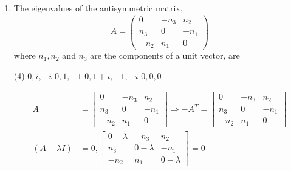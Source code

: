 \begin{enumerate}[label=\color{ocre}\textbf{\arabic*.}]
\begin{answer}
	\begin{align*}
	\intertext{The given matrix $A$ has identical rows and columns}
	\intertext{So it's eigen values are,}
	\lambda=0,0\ \text{Trace}=0,0,14
	\intertext{Another solution}
	\text{For eigenvalues }|A-\lambda I|=0 \Rightarrow\left[\begin{array}{ccc}1-\lambda & 2 & 3 \\ 2 & 4-\lambda & 6 \\ 3 & 6 & 9-\lambda\end{array}\right]&=0\\
	(1-\lambda)[(4-\lambda)(9-\lambda)-36]-2[2(9-\lambda)-18]+3[12-3(4-\lambda)]&=0\\
	(1-\lambda)(4-\lambda)(9-\lambda)-36(1-\lambda)-4(9-\lambda)+36+9 \lambda&=0\\
	\lambda^{3}-14 \lambda^{2}=0 \Rightarrow \lambda^{2}(\lambda-14)=0 \Rightarrow \lambda&=0,0,14
	\end{align*}
	So the correct answer is \textbf{Option (D)}
\end{answer}
	\item The eigenvalues of the antisymmetric matrix,
	$$
	A=\left(\begin{array}{ccc}
	0 & -n_{3} & n_{2} \\
	n_{3} & 0 & -n_{1} \\
	-n_{2} & n_{1} & 0
	\end{array}\right)
	$$
	where $n_{1}, n_{2}$ and $n_{3}$ are the components of a unit vector, are
	{}
	\begin{tasks}(4)
		\task[\textbf{A.}] $0, i,-i$
		\task[\textbf{B.}] $0,1,-1$
		\task[\textbf{C.}] $0,1+i,-1,-i$
		\task[\textbf{D.}]  $0,0,0$
	\end{tasks}
	\begin{answer}
		\begin{align*}
		A&=\left[\begin{array}{ccc}0 & -n_{3} & n_{2} \\ n_{3} & 0 & -n_{1} \\ -n_{2} & n_{1} & 0\end{array}\right] \Rightarrow-A^{T}=\left[\begin{array}{ccc}0 & -n_{3} & n_{2} \\ n_{3} & 0 & -n_{1} \\ -n_{2} & n_{1} & 0\end{array}\right]\\
		(A-\lambda I)&=0,\left[\begin{array}{ccc}0-\lambda & -n_{3} & n_{2} \\ n_{3} & 0-\lambda & -n_{1} \\ -n_{2} & n_{1} & 0-\lambda\end{array}\right]=0\\

\end{align*}
\end{answer}
\end{enumerate}
